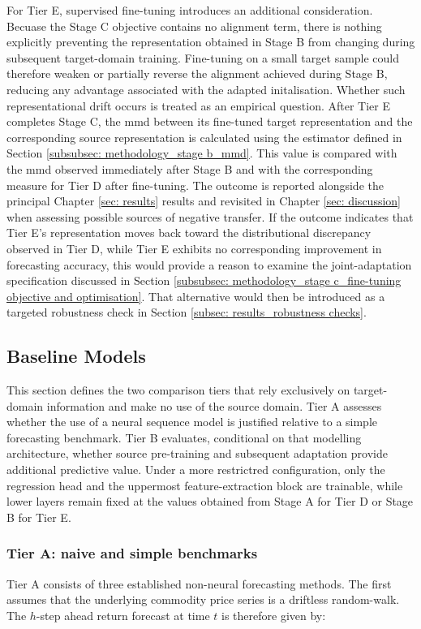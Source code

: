 For Tier E, supervised fine-tuning introduces an additional consideration. Becuase the Stage C objective contains no alignment term, there is nothing explicitly preventing the representation obtained in Stage B from changing during subsequent target-domain training. Fine-tuning on a small target sample could therefore weaken or partially reverse the alignment achieved during Stage B, reducing any advantage associated with the adapted initalisation. Whether such representational drift occurs is treated as an empirical question. After Tier E completes Stage C, the \ac{mmd} between its fine-tuned target representation and the corresponding source representation is calculated using the estimator defined in Section \ref{subsubsec: methodology_stage b_mmd}. This value is compared with the \ac{mmd} observed immediately after Stage B and with the corresponding measure for Tier D after fine-tuning. The outcome is reported alongside the principal Chapter \ref{sec: results} results and revisited in Chapter \ref{sec: discussion} when assessing possible sources of negative transfer. If the outcome indicates that Tier E's representation moves back toward the distributional discrepancy observed in Tier D, while Tier E exhibits no corresponding improvement in forecasting accuracy, this would provide a reason to examine the joint-adaptation specification discussed in Section \ref{subsubsec: methodology_stage c_fine-tuning objective and optimisation}. That alternative would then be introduced as a targeted robustness check in Section \ref{subsec: results_robustness checks}.

\subsection{Baseline Models} \label{subsec: methodology_baseline models}
This section defines the two comparison tiers that rely exclusively on target-domain information and make no use of the source domain. Tier A assesses whether the use of a neural sequence model is justified relative to a simple forecasting benchmark. Tier B evaluates, conditional on that modelling architecture, whether source pre-training and subsequent adaptation provide additional predictive value. Under a more restrictred configuration, only the regression head and the uppermost feature-extraction block are trainable, while lower layers remain fixed at the values obtained from Stage A for Tier D or Stage B for Tier E.

\subsubsection{Tier A: naive and simple benchmarks} \label{subsubsec: methodology_baseline models_tier a}
Tier A consists of three established non-neural forecasting methods. The first assumes that the underlying commodity price series is a driftless random-walk. The $h$-step ahead return forecast at time $t$ is therefore given by:

